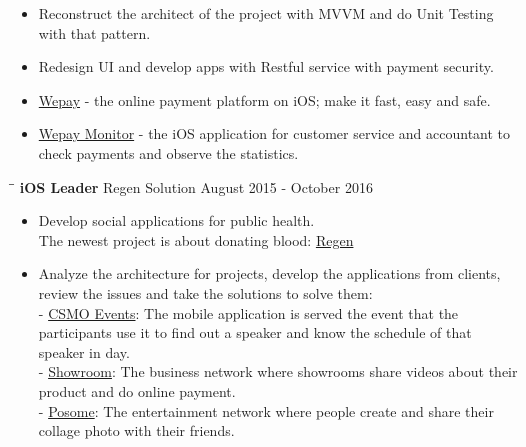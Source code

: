 \documentclass[margin, 10pt]{res}
\begin{document}
\begin{resume}
   \begin{itemize}
		\item Reconstruct the architect of the project with MVVM and do Unit Testing with that pattern.  
		\item Redesign UI and develop apps with Restful service with payment security.
		\item {\color{blue}\href{https://itunes.apple.com/au/app/vi-wepay/id1116328276?mt=8}{Wepay}} - the online payment platform on iOS; make it fast, easy and safe.
		\item {\color{blue}\href{}{Wepay Monitor}} - the iOS application for customer service and accountant to check payments and observe the statistics. 
   \end{itemize}
   
   \begin{tabbing}
   \hspace{2.0in}\= \hspace{2.0in}\= \kill %
   {\bf iOS Leader} \>Regen Solution \>August 2015 - October 2016\\
   \end{tabbing}\vspace{-20pt} %

   \begin{itemize}
   		\item Develop social applications for public health. \\ The newest project is about donating blood: {\color{blue}\href{https://itunes.apple.com/us/app/id1068139116}{Regen}}
		\item Analyze the architecture for projects, develop the applications from clients, review the issues and take the solutions to solve them:\\ - {\color{blue}\href{https://itunes.apple.com/us/app/csmo-events/id1152856867?ls=1&mt=8}{CSMO Events}}: The mobile application is served the event that the participants use it to find out a speaker and know the schedule of that speaker in day. \\ - {\color{blue}\href{https://itunes.apple.com/US/app/id787053829?mt=8}{Showroom}}: The business network where showrooms share videos about their product and do online payment.\\ - {\color{blue}\href{https://itunes.apple.com/kh/app/posome-long-distance-zero-gap/id1097859447?mt=8}{Posome}}: The entertainment network where people create and share their collage photo with their friends.
   \end{itemize}


\end{resume}
\end{document}
